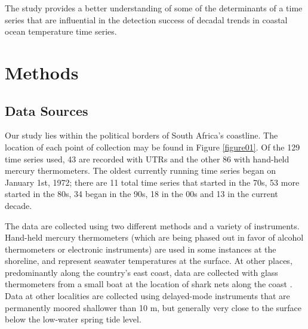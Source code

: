 \documentclass{ametsoc}
\begin{document}
The study provides a better understanding of some of the determinants of a time series that are influential in the detection success of decadal trends in coastal ocean temperature time series.

\section{Methods}

\subsection{Data Sources}
Our study lies within the political borders of South Africa's coastline. The location of each point of collection may be found in Figure \ref{figure01}. Of the 129 time series used, 43 are recorded with UTRs and the other 86 with hand-held mercury thermometers. The oldest currently running time series began on January 1st, 1972; there are 11 total time series that started in the 70s, 53 more started in the 80s, 34 began in the 90s, 18 in the 00s and 13 in the current decade.

The data are collected using two different methods and a variety of instruments. Hand-held mercury thermometers (which are being phased out in favor of alcohol thermometers or electronic instruments) are used in some instances at the shoreline, and represent seawater temperatures at the surface. At other places, predominantly along the country's east coast, data are collected with glass thermometers from a small boat at the location of shark nets along the coast \citep{Cliff1988}. Data at other localities are collected using delayed-mode instruments that are permanently moored shallower than 10 m, but generally very close to the surface below the low-water spring tide level.
\end{document}

